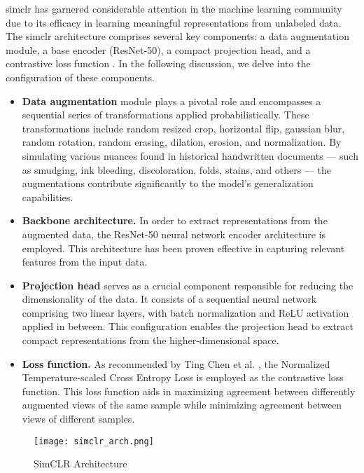 \gls{simclr} has garnered considerable attention in the machine learning community due to its efficacy in learning meaningful representations from unlabeled data. The \gls{simclr} architecture comprises several key components: a data augmentation module, a base encoder (ResNet-50), a compact projection head, and a contrastive loss function \cite{chen_simple_2020}. In the following discussion, we delve into the configuration of these components.

\begin{itemize}

\item{\textbf{Data augmentation}} module plays a pivotal role and encompasses a sequential series of transformations applied probabilistically. These transformations include random resized crop, horizontal flip, gaussian blur, random rotation, random erasing, dilation, erosion, and normalization. By simulating various nuances found in historical handwritten documents — such as smudging, ink bleeding, discoloration, folds, stains, and others — the augmentations contribute significantly to the model's generalization capabilities.

\item{\textbf{Backbone architecture.}} In order to extract representations from the augmented data, the ResNet-50 neural network encoder architecture is employed. This architecture has been proven effective in capturing relevant features from the input data.

\item{\textbf{Projection head}} serves as a crucial component responsible for reducing the dimensionality of the data. It consists of a sequential neural network comprising two linear layers, with batch normalization and ReLU activation applied in between. This configuration enables the projection head to extract compact representations from the higher-dimensional space.

\item{\textbf{Loss function.}} As recommended by Ting Chen et al. \cite{chen_simple_2020}, the Normalized Temperature-scaled Cross Entropy Loss is employed as the contrastive loss function. This loss function aids in maximizing agreement between differently augmented views of the same sample while minimizing agreement between views of different samples.

\end{itemize}

\begin{figure}[ht]
\texttt{[image: simclr\_arch.png]}
\centering
\caption{SimCLR Architecture}
\label{fig:figure}
\end{figure}

